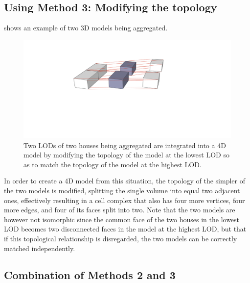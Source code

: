 \subsection{Using Method 3: Modifying the topology}

 shows an example of two 3D models being aggregated.
\begin{figure}[tb]
   \centering
   \includegraphics[width=\linewidth]{figs/agg2}
   \caption[Linking using topology modifications]{Two LODs of two houses being aggregated are integrated into a 4D model by modifying the topology of the model at the lowest LOD so as to match the topology of the model at the highest LOD.}
\label{fig:agg}
\end{figure}
In order to create a 4D model from this situation, the topology of the simpler of the two models is modified, splitting the single volume into equal two adjacent ones, effectively resulting in a cell complex that also has four more vertices, four more edges, and four of its faces split into two.
Note that the two models are however not isomorphic since the common face of the two houses in the lowest LOD becomes two disconnected faces in the model at the highest LOD, but that if this topological relationship is disregarded, the two models can be correctly matched independently.

\subsection{Combination of Methods 2 and 3}

